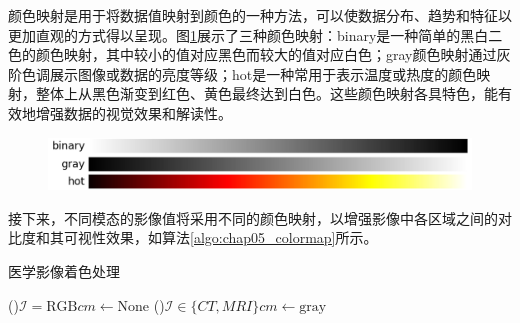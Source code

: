 颜色映射是用于将数据值映射到颜色的一种方法，可以使数据分布、趋势和特征以更加直观的方式得以呈现。图\ref{fig:chap05_colormap}展示了三种颜色映射：binary是一种简单的黑白二色的颜色映射，其中较小的值对应黑色而较大的值对应白色；gray颜色映射通过灰阶色调展示图像或数据的亮度等级；hot是一种常用于表示温度或热度的颜色映射，整体上从黑色渐变到红色、黄色最终达到白色。这些颜色映射各具特色，能有效地增强数据的视觉效果和解读性。

\begin{figure}[htbp]
  \centering
  \includegraphics[width=\textwidth]{figures/chap05_colormap.jpg}
  \label{fig:chap05_colormap}
\end{figure}

接下来，不同模态的影像值将采用不同的颜色映射，以增强影像中各区域之间的对比度和其可视性效果，如算法\ref{algo:chap05_colormap}所示。

\begin{algorithm}
  \caption{医学影像着色处理}
  \label{algo:chap05_colormap}
  \vspace{5pt}

  \lIf(){$\mathcal{I} = \text{RGB}$}{$cm \leftarrow \text{None}$}
  \lElseIf(){$\mathcal{I} \in \{CT,MRI\}$}{$cm \leftarrow \text{gray}$}
\end{algorithm}

